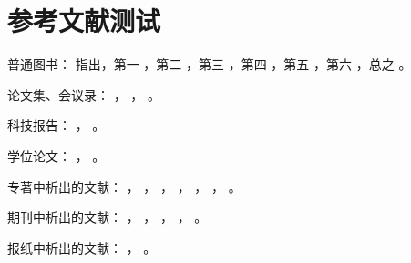 
\chapter{参考文献测试}

普通图书：
\citet{gxzzzzqlyt1993}指出，第一
\citep{jiangyouxu1998}，第二
\citep{tangxujun1999}，第三
\citep{zhaokaihua1995}，第四
\citep{wangang1912}，第五
\citep{zhaoyaodong1998}，第六
\citep{crawfprd1995}，总之
\citep{iflai1977,obrien1994,rood2001,angwen1988}。

论文集、会议录：
\citep{zglxxh1990}，
\citep{ROSENTHALL1963}，
\citep{GANZHA2000}。

科技报告：
\citep{dtha1990}，
\citep{who1970}。

学位论文：
\citep{ZHANGZHIXIANG1998}，
\citep{CALMS1965}。

专著中析出的文献：
\citep{baishunong1998}，
\citep{gjbzjxxflbmyjs1988}，
\citep{hanjiren1985}，
\citep{BUSECK1980}，
\citep{FOURNEY1971}，
\citep{feilisheng1981}，
\citep{MARTIN1996}。

期刊中析出的文献：
\citep{libingmu2000}，
\citep{taorengji1984}，
\citep{yzdztbmz1978}，
\citep{MARAIS1992}，
\citep{HEWITT1984}。

报纸中析出的文献：
\citep{Dingwenxiang2000}，
\citep{Zhangtianqing2000}。

